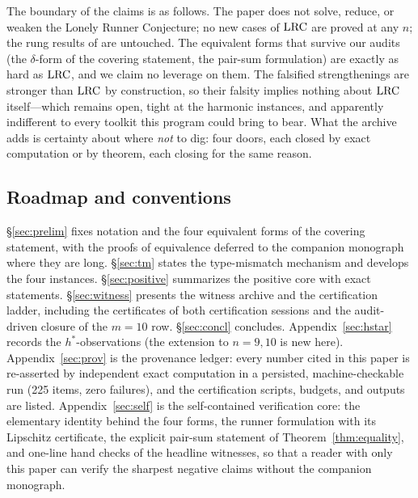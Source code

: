 The boundary of the claims is as follows. The paper does not solve,
reduce, or weaken the Lonely Runner Conjecture; no new cases of $\mathrm{LRC}$
are proved at any $n$; the rung results of
\cite{Rosenfeld8,Trakulthongchai,Sungkawichai,Allikvere} are untouched.
The equivalent forms that survive our audits (the $\delta$-form of the
covering statement, the pair-sum formulation) are exactly as hard as
$\mathrm{LRC}$, and we claim no leverage on them. The falsified strengthenings
are stronger than $\mathrm{LRC}$ by construction, so their falsity implies
nothing about $\mathrm{LRC}$ itself---which remains open, tight at the harmonic
instances, and apparently indifferent to every toolkit this program could
bring to bear. What the archive adds is certainty about where \emph{not}
to dig: four doors, each closed by exact computation or by theorem, each
closing for the same reason.

\subsection{Roadmap and conventions}

\S\ref{sec:prelim} fixes notation and the four equivalent forms of the
covering statement, with the proofs of equivalence deferred to the
companion monograph where they are long. \S\ref{sec:tm} states the
type-mismatch mechanism and develops the four instances.
\S\ref{sec:positive} summarizes the positive core with exact statements.
\S\ref{sec:witness} presents the witness archive and the certification
ladder, including the certificates of both certification sessions and
the audit-driven closure of the $m=10$ row.
\S\ref{sec:concl} concludes. Appendix~\ref{sec:hstar} records the
$h^*$-observations (the extension to $n=9,10$ is new here).
Appendix~\ref{sec:prov} is the provenance ledger: every number cited in
this paper is re-asserted by independent exact computation in a
persisted, machine-checkable run (225 items, zero failures), and the
certification scripts, budgets, and outputs are listed.
Appendix~\ref{sec:self} is the self-contained verification core: the
elementary identity behind the four forms, the runner formulation with
its Lipschitz certificate, the explicit pair-sum statement of
Theorem~\ref{thm:equality}, and one-line hand checks of the headline
witnesses, so that a reader with only this paper can verify the sharpest
negative claims without the companion monograph.

